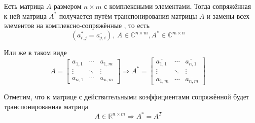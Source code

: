 \begin{definition}
    Есть матрица $A$ размером $n \times m$ с комплексными элементами.
    Тогда сопряжённая к ней матрица $A^*$ получается путём транспонирования
    матрицы $A$ и замены всех элементов на комплексно-сопряжённые
    \cite[с.~243]{VoevodinLA}, то есть
    $$\left( a_{i,j}^* = \overline{a_{j,i}} \right),\;
    A \in \mathbb{C}^{n \times m}, A^* \in \mathbb{C}^{m \times n}$$

    Или же в таком виде
    $$A =
    \begin{bmatrix}
        a_{1,1} & \cdots & a_{1,m} \\
        \vdots & \ddots & \vdots \\
        a_{n,1} & \cdots & a_{n,m}
    \end{bmatrix}
        \Rightarrow
    A^* = 
    \begin{bmatrix}
        \overline{a_{1,1}} & \cdots & \overline{a_{n,1}} \\
        \vdots & \ddots & \vdots \\
        \overline{a_{1,m}} & \cdots & \overline{a_{n,m}}
    \end{bmatrix}$$
\end{definition}

\begin{remark}
    Отметим, что к матрице с действительными коэффициентами сопряжённой будет
    транспонированная матрица
    $$A \in \mathbb{R}^{n \times m} \Rightarrow A^* = A^T$$
\end{remark}


